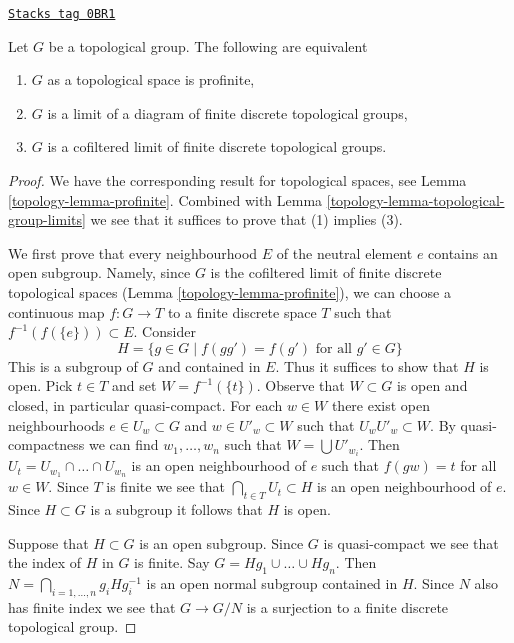 \begin{lemma}
\label{topology-lemma-profinite-group}
\href{https://stacks.math.columbia.edu/tag/0BR1}{\texttt{Stacks tag 0BR1}}

Let $G$ be a topological group. The following are equivalent
\begin{enumerate}
\item $G$ as a topological space is profinite,
\item $G$ is a limit of a diagram of finite discrete topological groups,
\item $G$ is a cofiltered limit of finite discrete topological groups.
\end{enumerate}
\end{lemma}

\begin{proof}

We have the corresponding result for topological spaces, see
Lemma \ref{topology-lemma-profinite}. Combined with
Lemma \ref{topology-lemma-topological-group-limits}
we see that it suffices to prove that (1) implies (3).

\medskip\noindent
We first prove that every neighbourhood $E$ of the neutral element $e$ contains
an open subgroup. Namely, since $G$ is the cofiltered limit of finite
discrete topological spaces (Lemma \ref{topology-lemma-profinite}),
we can choose a continuous map $f : G \to T$ to a finite discrete
space $T$ such that $f^{-1}(f(\{e\})) \subset E$.
Consider
$$
H = \{g \in G \mid f(gg') = f(g')\text{ for all }g' \in G\}
$$
This is a subgroup of $G$ and contained in $E$. Thus it suffices to
show that $H$ is open. Pick $t \in T$ and set $W = f^{-1}(\{t\})$.
Observe that $W \subset G$ is open and closed, in particular quasi-compact.
For each $w \in W$ there exist open neighbourhoods $e \in U_w \subset G$
and $w \in U'_w \subset W$ such that $U_wU'_w \subset W$.
By quasi-compactness we can find $w_1, \ldots, w_n$ such that
$W = \bigcup U'_{w_i}$. Then
$U_t = U_{w_1} \cap \ldots \cap U_{w_n}$ is an open neighbourhood
of $e$ such that $f(gw) = t$ for all $w \in W$.
Since $T$ is finite we see that $\bigcap_{t \in T} U_t \subset H$
is an open neighbourhood of $e$. Since $H \subset G$ is a subgroup
it follows that $H$ is open.

\medskip\noindent
Suppose that $H \subset G$ is an open subgroup. Since $G$ is quasi-compact
we see that the index of $H$ in $G$ is finite. Say
$G = Hg_1 \cup \ldots \cup Hg_n$. Then
$N = \bigcap_{i = 1, \ldots, n} g_iHg_i^{-1}$ is
an open normal subgroup contained in $H$. Since $N$ also has finite
index we see that $G \to G/N$ is a surjection to a finite discrete
topological group.


\end{proof}
